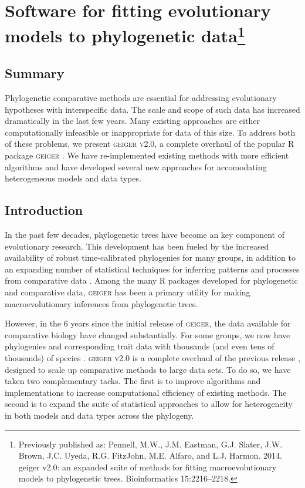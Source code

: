 \chapter[Software for fitting evolutionary models to phylogenetic data]{Software for fitting evolutionary models to phylogenetic data\footnote{Previously published as: Pennell, M.W., J.M. Eastman, G.J. Slater, J.W. Brown, J.C. Uyeda,
  R.G. FitzJohn, M.E. Alfaro, and L.J. Harmon. 2014.
  geiger v2.0: an expanded suite of methods for fitting macroevolutionary
  models to phylogenetic trees. Bioinformatics 15:2216--2218.}} 
\label{chap:geiger}

\section{Summary}
Phylogenetic comparative methods are essential for addressing evolutionary hypotheses with interspecific data. The scale and scope of such data has increased dramatically in the last few years. Many existing approaches are either computationally infeasible or inappropriate for data of this size. To address both of these problems, we present \textsc{geiger v2.0}, a complete overhaul of the popular R package \textsc{geiger} \citep{Harmon2008}. We have re-implemented existing methods with more efficient algorithms and have developed several new approaches for accomodating heterogeneous models and data types.  


\section{Introduction}

In the past few decades, phylogenetic trees have become an key component of evolutionary research. This development has been fueled by the increased availability of robust time-calibrated phylogenies for many groups, in addition to an expanding number of statistical techniques for inferring patterns and processes from comparative data \citep[reviewed in][]{PennellHarmon}. Among the many R packages developed for phylogenetic and comparative data, \textsc{geiger} \citep{Harmon2008} has been a primary utility for making macroevolutionary inferences from phylogenetic trees. 

However, in the 6 years since the initial release of \textsc{geiger}, the data available for comparative biology have changed substantially. For some groups, we now have phylogenies and corresponding trait data with thousands (and even tens of thousands) of species \citep[e.g.,][]{Jetz2012, Rabosky2012, PyronBurbrink2013, ksi,Zanne}. \textsc{geiger v2.0} is a complete overhaul of the previous release \citep{Harmon2008}, designed to scale up comparative methods to large data sets. To do so,  we have taken two complementary tacks. The first is to improve algorithms and implementations to increase computational efficiency of existing methods. The second is to expand the suite of statistical approaches to allow for heterogeneity in both models and data types across the phylogeny.  

